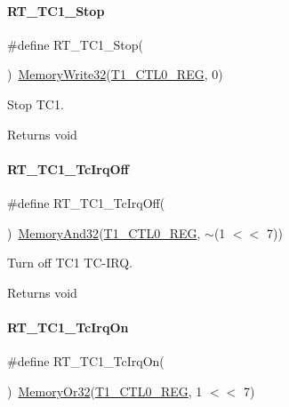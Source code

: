 \paragraph{\texorpdfstring{R\+T\+\_\+\+T\+C1\+\_\+\+Stop}{RT\_TC1\_Stop}}
{\footnotesize\ttfamily \#define R\+T\+\_\+\+T\+C1\+\_\+\+Stop(\begin{DoxyParamCaption}{ }\end{DoxyParamCaption})~\mbox{\hyperlink{a00020_a6b9732365b12e48ddb89fe1028b975b0}{Memory\+Write32}}(\mbox{\hyperlink{a00020_adadaa0ab1ebbd7ba9b70dfd24c3ed44da38632250c2e72df96fcaa3f8bd8ecc5e}{T1\+\_\+\+C\+T\+L0\+\_\+\+R\+EG}}, 0)}



Stop T\+C1. 

\begin{DoxyReturn}{Returns}
void 
\end{DoxyReturn}
\mbox{\label{a00044_ad8775d32f1b8cb982c2abf045e3b6b95}} 
\paragraph{\texorpdfstring{R\+T\+\_\+\+T\+C1\+\_\+\+Tc\+Irq\+Off}{RT\_TC1\_TcIrqOff}}
{\footnotesize\ttfamily \#define R\+T\+\_\+\+T\+C1\+\_\+\+Tc\+Irq\+Off(\begin{DoxyParamCaption}{ }\end{DoxyParamCaption})~\mbox{\hyperlink{a00020_ad87cedffcaadc51db22594fce55173d4}{Memory\+And32}}(\mbox{\hyperlink{a00020_adadaa0ab1ebbd7ba9b70dfd24c3ed44da38632250c2e72df96fcaa3f8bd8ecc5e}{T1\+\_\+\+C\+T\+L0\+\_\+\+R\+EG}}, $\sim$(1 $<$$<$ 7))}



Turn off T\+C1 T\+C-\/\+I\+RQ. 

\begin{DoxyReturn}{Returns}
void 
\end{DoxyReturn}
\mbox{\label{a00044_adbef657c94c7b32f07e4210fbf7f4745}} 
\paragraph{\texorpdfstring{R\+T\+\_\+\+T\+C1\+\_\+\+Tc\+Irq\+On}{RT\_TC1\_TcIrqOn}}
{\footnotesize\ttfamily \#define R\+T\+\_\+\+T\+C1\+\_\+\+Tc\+Irq\+On(\begin{DoxyParamCaption}{ }\end{DoxyParamCaption})~\mbox{\hyperlink{a00020_a27874a97deab7cecdde5ddecf466e31e}{Memory\+Or32}}(\mbox{\hyperlink{a00020_adadaa0ab1ebbd7ba9b70dfd24c3ed44da38632250c2e72df96fcaa3f8bd8ecc5e}{T1\+\_\+\+C\+T\+L0\+\_\+\+R\+EG}}, 1 $<$$<$ 7)}



